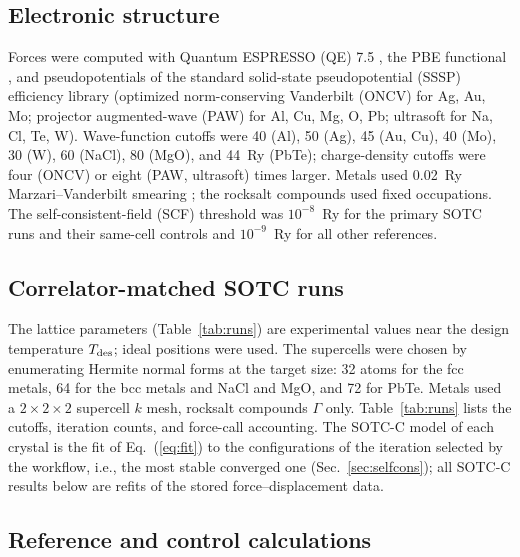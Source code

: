 \documentclass[aip,jap,reprint,amsmath,amssymb,floatfix]{revtex4-2}
\begin{document}
\subsection{Electronic structure}

Forces were computed with Quantum ESPRESSO (QE) 7.5 \cite{ref46}, the PBE functional
\cite{ref17}, and pseudopotentials of the standard solid-state pseudopotential (SSSP)
efficiency library \cite{ref47} (optimized norm-conserving Vanderbilt (ONCV) for Ag,
Au, Mo; projector augmented-wave (PAW) for Al, Cu, Mg, O, Pb; ultrasoft for Na, Cl, Te, W). Wave-function
cutoffs were 40 (Al), 50 (Ag), 45 (Au, Cu), 40 (Mo), 30 (W), 60 (NaCl), 80
(MgO), and 44~Ry (PbTe); charge-density cutoffs were four (ONCV) or eight
(PAW, ultrasoft) times larger. Metals used 0.02~Ry Marzari--Vanderbilt
smearing \cite{ref18}; the rocksalt compounds used fixed occupations. The
self-consistent-field (SCF) threshold was $10^{-8}$~Ry for the primary SOTC runs and their same-cell
controls and $10^{-9}$~Ry for all other references.

\subsection{Correlator-matched SOTC runs}

The lattice parameters (Table~\ref{tab:runs}) are experimental values near the
design temperature $T_{\rm des}$; ideal positions were used. The supercells
were chosen by enumerating Hermite normal forms at the target size: 32 atoms
for the fcc metals, 64 for the bcc metals and NaCl and MgO, and 72 for PbTe.
Metals used a $2\times2\times2$ supercell $k$ mesh, rocksalt compounds
$\Gamma$ only. Table~\ref{tab:runs} lists the cutoffs, iteration counts, and
force-call accounting. The SOTC-C model of each crystal is the fit of
Eq.~(\ref{eq:fit}) to the configurations of the iteration selected by the
workflow, i.e., the most stable converged one (Sec.~\ref{sec:selfcons}); all SOTC-C results below are refits of the stored
force--displacement data.



\subsection{Reference and control calculations}
\end{document}
